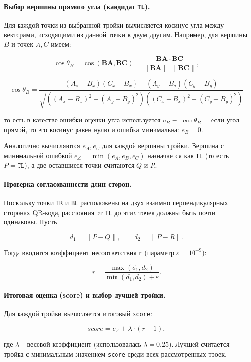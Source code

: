 \paragraph{Выбор вершины прямого угла (кандидат \texttt{TL}).}
Для каждой точки из выбранной тройки вычисляется косинус угла между векторами, исходящими из данной точки к двум другим.
Например, для вершины $B$ и точек $A, C$ имеем:

$$ \cos \theta_B = \cos(\mathbf{BA}, \mathbf{BC}) = \frac{\mathbf{BA} \cdot \mathbf{BC}}{\| \mathbf{BA} \| \; \| \mathbf{BC} \|}, $$

$$ \cos \theta_B = \frac{(A_x - B_x)(C_x - B_x) + (A_y - B_y)(C_y - B_y)}{\sqrt{((A_x - B_x)^2 + (A_y - B_y)^2)((C_x - B_x)^2 + (C_y - B_y)^2)}} $$

то есть в качестве ошибки оценки угла используется $e_B = |\cos\theta_B|$ -- если угол прямой, то его косинус равен нулю и ошибка минимальна: $e_B = 0$.

Аналогично вычисляются $e_A, e_C$ для каждой вершины тройки.
Вершина с минимальной ошибкой $ e_{\angle} = \min(e_A, e_B, e_C) $ назначается как \texttt{TL} (то есть $P = \texttt{TL}$), а две оставшиеся точки считаются $Q$ и $R$.

\paragraph{Проверка согласованности длин сторон.}
Поскольку точки \texttt{TR} и \texttt{BL} расположены на двух взаимно перпендикулярных сторонах QR-кода, расстояния от \texttt{TL} до этих точек должны быть почти одинаковы.
Пусть

$$ d_1 = \| P - Q \|,\qquad d_2 = \| P - R \|. $$

Тогда вводится коэффициент несоответствия \texttt{r} (параметр $\varepsilon = 10^{-9}$):

$$ r = \frac{\max(d_1, d_2)}{\min(d_1, d_2) + \varepsilon}. $$

\paragraph{Итоговая оценка (score) и выбор лучшей тройки.}
Для каждой тройки вычисляется итоговый \texttt{score}:

$$ score = e_{\angle} + \lambda \cdot (r - 1), $$

где $\lambda$ -- весовой коэффициент (использовалась $\lambda = 0.25$).
Лучшей считается тройка с минимальным значением \texttt{score} среди всех рассмотренных троек.

